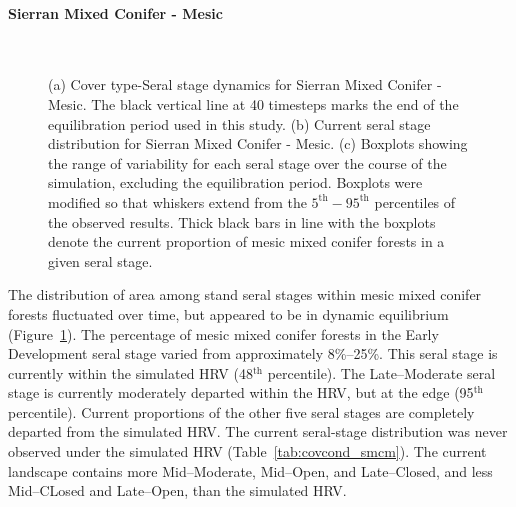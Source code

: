 \clearpage

\paragraph*{Sierran Mixed Conifer - Mesic}

\begin{figure}[!htbp]
  \centering
   \\
  \caption{(a) Cover type-Seral stage dynamics for Sierran Mixed Conifer - Mesic. The black vertical line at 40 timesteps marks the end of the equilibration period used in this study. (b) Current seral stage distribution for Sierran Mixed Conifer - Mesic. (c) Boxplots showing the range of variability for each seral stage over the course of the simulation, excluding the equilibration period. Boxplots were modified so that whiskers extend from the $5^{\text{th}} - 95^{\text{th}}$ percentiles of the observed results. Thick black bars in line with the boxplots denote the current proportion of mesic mixed conifer forests in a given seral stage.} 
  \label{fig:hrv-covcond_smcm}
\end{figure}

The distribution of area among stand seral stages within mesic mixed conifer forests fluctuated over time, but appeared to be in dynamic equilibrium (Figure~\ref{fig:hrv-covcond_smcm}). The percentage of mesic mixed conifer forests in the Early Development seral stage varied from approximately 8\%--25\%. This seral stage is currently within the simulated HRV (48$^{\text{th}}$ percentile). The Late--Moderate seral stage is currently moderately departed within the HRV, but at the edge (95$^{\text{th}}$ percentile). Current proportions of the other five seral stages are completely departed from the simulated HRV.  The current seral-stage distribution was never observed under the simulated HRV (Table~\ref{tab:covcond_smcm}). The current landscape contains more Mid--Moderate, Mid--Open, and Late--Closed, and less Mid--CLosed and Late--Open, than the simulated HRV.


